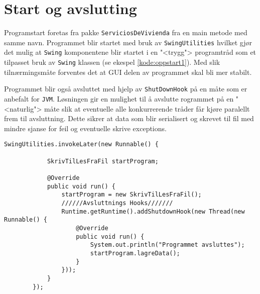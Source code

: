 \section{Start og avslutting}
Programstart foretas fra pakke \texttt{ServiciosDeVivienda} fra en main metode med samme navn. Programmet blir startet med bruk av \texttt{SwingUtilities} hvilket gjør det mulig at \texttt{Swing} komponentene blir startet i en "<trygg"> programtråd som et tilpasset bruk av \texttt{Swing} klassen (se ekespel \ref{kode:oppstart1}). Med slik tilnærmingsmåte forventes det at GUI delen av programmet skal bli mer stabilt. 

Programmet blir også avsluttet med hjelp av \texttt{ShutDownHook} på en måte som er anbefalt for \texttt{JVM}. Løsningen gir en mulighet til å avslutte rogrammet på en "<naturlig"> måte slik at eventuelle alle konkurrerende tråder får kjøre paralellt frem til avsluttning. Dette sikrer at data som blir serialisert og skrevet til fil med mindre sjanse for feil og eventuelle skrive exceptions.

\begin{lstlisting}[caption=Oppstart av programmet., label=kode:oppstart1]
        SwingUtilities.invokeLater(new Runnable() {

            SkrivTilLesFraFil startProgram;

            @Override
            public void run() {
                startProgram = new SkrivTilLesFraFil();
                //////Avsluttnings Hooks///////
                Runtime.getRuntime().addShutdownHook(new Thread(new Runnable() {
                    @Override
                    public void run() {
                        System.out.println("Programmet avsluttes");
                        startProgram.lagreData();
                    }
                }));
            }
        });
\end{lstlisting}